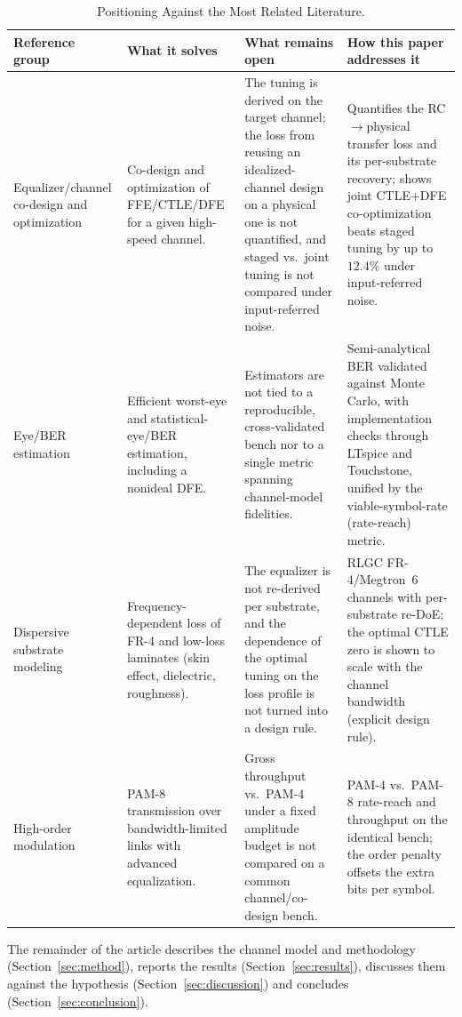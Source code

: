 \documentclass[twocolumn]{USG}
\begin{document}
\begin{table}[!t]
\caption{Positioning Against the Most Related Literature.}
\label{tab:gap}\centering
\footnotesize
\begin{tabular}{p{} p{} p{} p{}}
\hline
\textbf{Reference group} & \textbf{What it solves} & \textbf{What remains open} & \textbf{How this paper addresses it} \\
\hline
Equalizer/channel co-design and optimization \cite{11169790,11346689,11309336}
& Co-design and optimization of FFE/CTLE/DFE for a given high-speed channel.
& The tuning is derived on the target channel; the loss from reusing an idealized-channel design on a physical one is not quantified, and staged vs.\ joint tuning is not compared under input-referred noise.
& Quantifies the RC$\rightarrow$physical transfer loss and its per-substrate recovery; shows joint CTLE+DFE co-optimization beats staged tuning by up to $12.4\%$ under input-referred noise. \\
\hline
Eye/BER estimation \cite{10705630,10415105,10584882}
& Efficient worst-eye and statistical-eye/BER estimation, including a nonideal DFE.
& Estimators are not tied to a reproducible, cross-validated bench nor to a single metric spanning channel-model fidelities.
& Semi-analytical BER validated against Monte Carlo, with implementation checks through LTspice and Touchstone, unified by the viable-symbol-rate (rate-reach) metric. \\
\hline
Dispersive substrate modeling \cite{9785524,10385078,9888577}
& Frequency-dependent loss of FR-4 and low-loss laminates (skin effect, dielectric, roughness).
& The equalizer is not re-derived per substrate, and the dependence of the optimal tuning on the loss profile is not turned into a design rule.
& RLGC FR-4/Megtron~6 channels with per-substrate re-DoE; the optimal CTLE zero is shown to scale with the channel bandwidth (explicit design rule). \\
\hline
High-order modulation \cite{8963973}
& PAM-8 transmission over bandwidth-limited links with advanced equalization.
& Gross throughput vs.\ PAM-4 under a fixed amplitude budget is not compared on a common channel/co-design bench.
& PAM-4 vs.\ PAM-8 rate-reach and throughput on the identical bench; the order penalty offsets the extra bits per symbol. \\
\hline
\end{tabular}
\end{table}

The remainder of the article describes the channel model and methodology
(Section~\ref{sec:method}), reports the results
(Section~\ref{sec:results}), discusses them against the hypothesis
(Section~\ref{sec:discussion}) and concludes
(Section~\ref{sec:conclusion}).
\end{document}
